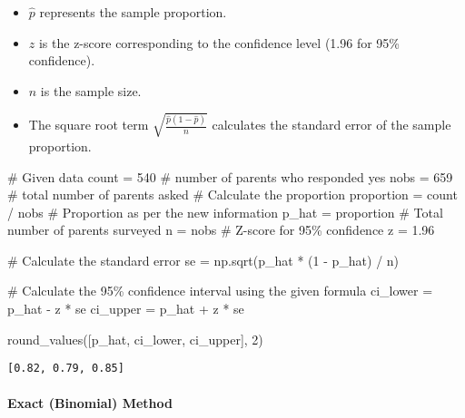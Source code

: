 \documentclass[
  letterpaper,
  DIV=11,
  numbers=noendperiod]{scrartcl}
\let\oldparagraph\paragraph
\renewcommand{\paragraph}[1]{\oldparagraph{#1}\mbox{}}
\newenvironment{Shaded}{\begin{snugshade}}{\end{snugshade}}
\newcommand{\CommentTok}[1]{\textcolor[rgb]{0.37,0.37,0.37}{#1}}
\newcommand{\DecValTok}[1]{\textcolor[rgb]{0.68,0.00,0.00}{#1}}
\newcommand{\FloatTok}[1]{\textcolor[rgb]{0.68,0.00,0.00}{#1}}
\newcommand{\NormalTok}[1]{\textcolor[rgb]{0.00,0.23,0.31}{#1}}
\newcommand{\OperatorTok}[1]{\textcolor[rgb]{0.37,0.37,0.37}{#1}}
\providecommand{\tightlist}{%
  \setlength{\itemsep}{0pt}\setlength{\parskip}{0pt}}\usepackage{longtable,booktabs,array}
\begin{document}
\begin{itemize}
\tightlist
\item
  \(\hat{p}\) represents the sample proportion.
\item
  \(z\) is the z-score corresponding to the confidence level (1.96 for
  95\% confidence).
\item
  \(n\) is the sample size.
\item
  The square root term \(\sqrt{\frac{\hat{p}(1 - \hat{p})}{n}}\)
  calculates the standard error of the sample proportion.
\end{itemize}

\begin{Shaded}
\begin{Highlighting}[]

\CommentTok{\# Given data}
\NormalTok{count }\OperatorTok{=} \DecValTok{540}  \CommentTok{\# number of parents who responded \textquotesingle{}yes\textquotesingle{}}
\NormalTok{nobs }\OperatorTok{=} \DecValTok{659}   \CommentTok{\# total number of parents asked}
\CommentTok{\# Calculate the proportion}
\NormalTok{proportion }\OperatorTok{=}\NormalTok{ count }\OperatorTok{/}\NormalTok{ nobs}
\CommentTok{\# Proportion as per the new information}
\NormalTok{p\_hat }\OperatorTok{=}\NormalTok{ proportion}
\CommentTok{\# Total number of parents surveyed}
\NormalTok{n }\OperatorTok{=}\NormalTok{ nobs}
\CommentTok{\# Z{-}score for 95\% confidence}
\NormalTok{z }\OperatorTok{=} \FloatTok{1.96}

\CommentTok{\# Calculate the standard error}
\NormalTok{se }\OperatorTok{=}\NormalTok{ np.sqrt(p\_hat }\OperatorTok{*}\NormalTok{ (}\DecValTok{1} \OperatorTok{{-}}\NormalTok{ p\_hat) }\OperatorTok{/}\NormalTok{ n)}

\CommentTok{\# Calculate the 95\% confidence interval using the given formula}
\NormalTok{ci\_lower }\OperatorTok{=}\NormalTok{ p\_hat }\OperatorTok{{-}}\NormalTok{ z }\OperatorTok{*}\NormalTok{ se}
\NormalTok{ci\_upper }\OperatorTok{=}\NormalTok{ p\_hat }\OperatorTok{+}\NormalTok{ z }\OperatorTok{*}\NormalTok{ se}

\NormalTok{round\_values([p\_hat, ci\_lower, ci\_upper], }\DecValTok{2}\NormalTok{)}
\end{Highlighting}
\end{Shaded}

\begin{verbatim}
[0.82, 0.79, 0.85]
\end{verbatim}

\hypertarget{exact-binomial-method}{%
\paragraph{Exact (Binomial) Method}\label{exact-binomial-method}}
\end{document}
